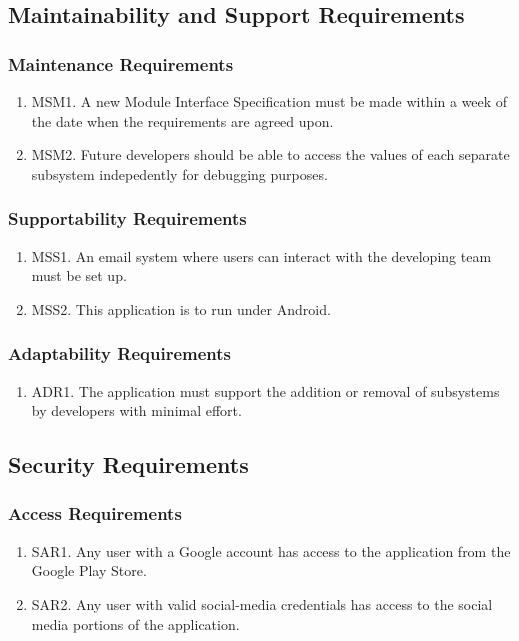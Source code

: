 \documentclass[]{article}
\begin{document}
\subsection{Maintainability and Support Requirements}
\subsubsection{Maintenance Requirements}
\begin{enumerate}
	\item MSM1. A new Module Interface Specification must be made within a week of the date when the requirements are agreed upon.
	\item MSM2. Future developers should be able to access the values of each separate subsystem indepedently for debugging purposes.
\end{enumerate}

\subsubsection{Supportability Requirements}
\begin{enumerate}
	\item MSS1. An email system where users can interact with the developing team must be set up.
	\item MSS2. This application is to run under Android.
\end{enumerate}

\subsubsection{Adaptability Requirements}
\begin{enumerate}
	\item ADR1. The application must support the addition or removal of subsystems by developers with minimal effort.
\end{enumerate}

\subsection{Security Requirements}
\subsubsection{Access Requirements}
\begin{enumerate}
	\item SAR1. Any user with a Google account has access to the application from the Google Play Store.
	\item SAR2. Any user with valid social-media credentials has access to the social media portions of the application.
\end{enumerate}
\end{document}
